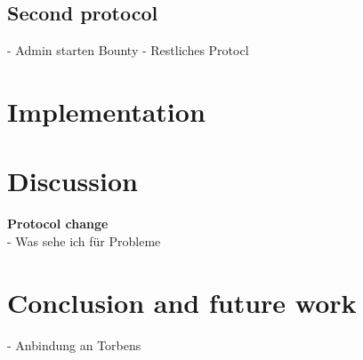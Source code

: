 \documentclass[sigconf]{acmart}
\begin{document}
\subsection{Second protocol}
- Admin starten Bounty
- Restliches Protocl

\section{Implementation}


\section{Discussion}
\textbf{Protocol change}\\
- Was sehe ich für Probleme

\section{Conclusion and future work}
- Anbindung an Torbens 







\appendix
\end{document}
